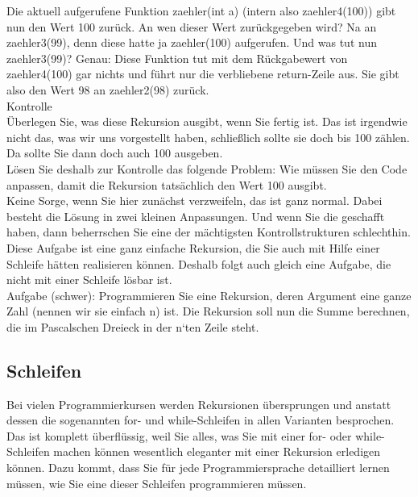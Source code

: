 Die aktuell aufgerufene Funktion zaehler(int a) (intern also zaehler4(100)) gibt nun den Wert 100 zurück. An wen dieser Wert zurückgegeben wird? Na an zaehler3(99), denn diese hatte ja zaehler(100) aufgerufen. Und was tut nun zaehler3(99)? Genau: Diese Funktion tut mit dem Rückgabewert von zaehler4(100) gar nichts und führt nur die verbliebene return-Zeile aus. Sie gibt also den Wert 98 an zaehler2(98) zurück.\\

Kontrolle\\

Überlegen Sie, was diese Rekursion ausgibt, wenn Sie \glqq{}fertig\grqq{} ist. Das ist irgendwie nicht das, was wir uns vorgestellt haben, schließlich sollte sie doch bis 100 zählen. Da sollte Sie dann doch auch 100 ausgeben. \\

Lösen Sie deshalb zur Kontrolle das folgende Problem: Wie müssen Sie den Code anpassen, damit die Rekursion tatsächlich den Wert 100 ausgibt. \\

Keine Sorge, wenn Sie hier zunächst verzweifeln, das ist ganz normal. Dabei besteht die Lösung in zwei kleinen Anpassungen. Und wenn Sie die geschafft haben, dann beherrschen Sie eine der mächtigsten Kontrollstrukturen schlechthin.\\

Diese Aufgabe ist eine ganz einfache Rekursion, die Sie auch mit Hilfe einer Schleife hätten realisieren können. Deshalb folgt auch gleich eine Aufgabe, die nicht mit einer Schleife lösbar ist.\\

Aufgabe (schwer): Programmieren Sie eine Rekursion, deren Argument eine ganze Zahl (nennen wir sie einfach n) ist. Die Rekursion soll nun die Summe berechnen, die im Pascalschen Dreieck in der n‘ten Zeile steht.

\subsection{Schleifen}

Bei vielen Programmierkursen werden Rekursionen übersprungen und anstatt dessen die sogenannten for- und while-Schleifen in allen Varianten besprochen. Das ist komplett überflüssig, weil Sie alles, was Sie mit einer for- oder while-Schleifen machen können wesentlich eleganter mit einer Rekursion erledigen können. Dazu kommt, dass Sie für jede Programmiersprache detailliert lernen müssen, wie Sie eine dieser Schleifen programmieren müssen.\\

